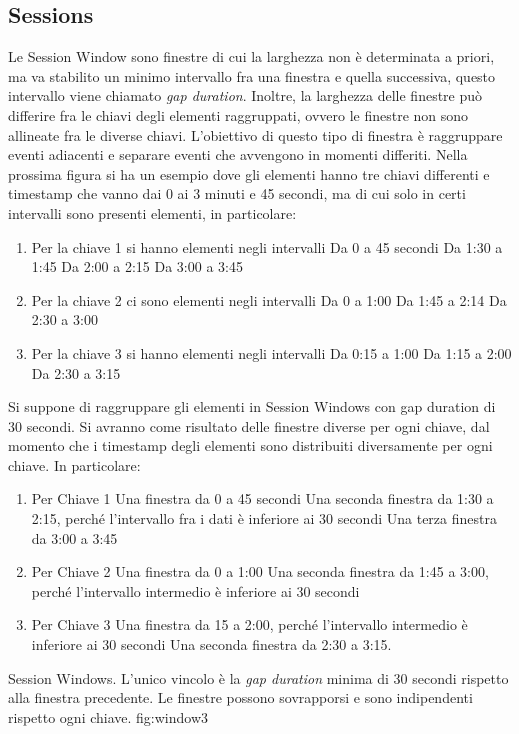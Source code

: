 \subsection{Sessions}
Le Session Window sono finestre di cui la larghezza non è determinata a priori, ma va stabilito un minimo intervallo fra una finestra e quella successiva, questo intervallo viene chiamato \textit{gap duration}. Inoltre, la larghezza delle finestre può differire fra le chiavi degli elementi raggruppati, ovvero le finestre non sono allineate fra le diverse chiavi. L’obiettivo di questo tipo di finestra è raggruppare eventi adiacenti e separare eventi che avvengono in momenti differiti. Nella prossima figura si ha un esempio dove gli elementi hanno tre chiavi differenti e timestamp che vanno dai 0 ai 3 minuti e 45 secondi, ma di cui solo in certi intervalli sono presenti elementi, in particolare:
\begin{enumerate}
\item Per la chiave 1 si hanno elementi negli intervalli
\subitem Da 0 a 45 secondi
\subitem Da 1:30 a 1:45
\subitem Da 2:00 a 2:15
\subitem Da 3:00 a 3:45
\item Per la chiave 2 ci sono elementi negli intervalli
\subitem Da 0 a 1:00
\subitem Da 1:45 a 2:14
\subitem Da 2:30 a 3:00
\item Per la chiave 3 si hanno elementi negli intervalli
\subitem Da 0:15 a 1:00
\subitem Da 1:15 a 2:00
\subitem Da 2:30 a 3:15
\end{enumerate}
Si suppone di raggruppare gli elementi in Session Windows con gap duration di 30 secondi. Si avranno come risultato delle finestre diverse per ogni chiave, dal momento che i timestamp degli elementi sono distribuiti diversamente per ogni chiave. In particolare:
\begin{enumerate}
\item Per Chiave 1
\subitem Una finestra da 0 a 45 secondi
\subitem Una seconda finestra da 1:30 a 2:15, perché l’intervallo fra i dati è inferiore ai 30 secondi
\subitem Una terza finestra da 3:00 a 3:45
\item Per Chiave 2
\subitem Una finestra da 0 a 1:00
\subitem Una seconda finestra da 1:45 a 3:00, perché l’intervallo intermedio è inferiore ai 30 secondi
\item Per Chiave 3
\subitem Una finestra da 15 a 2:00, perché l’intervallo intermedio è inferiore ai 30 secondi
\subitem Una seconda finestra da 2:30 a 3:15.
\end{enumerate}
{Session Windows. L'unico vincolo è la \textit{gap duration} minima di 30 secondi rispetto alla finestra precedente. Le finestre possono sovrapporsi e sono indipendenti rispetto ogni chiave. } 
{fig:window3}
